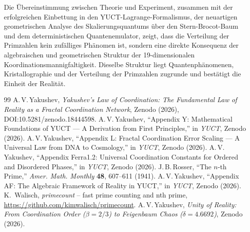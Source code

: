 \documentclass[11pt,a4paper]{article}
\begin{document}
	Die Übereinstimmung zwischen Theorie und Experiment, zusammen mit der erfolgreichen Einbettung in den YUCT-Lagrange-Formalismus, der neuartigen geometrischen Analyse des Skalierungsquantums über den Stern-Brocot-Baum und dem deterministischen Quantenemulator, zeigt, dass die Verteilung der Primzahlen kein zufälliges Phänomen ist, sondern eine direkte Konsequenz der algebraischen und geometrischen Struktur der 19-dimensionalen Koordinationsmannigfaltigkeit. Dieselbe Struktur liegt Quantenphänomenen, Kristallographie und der Verteilung der Primzahlen zugrunde und bestätigt die Einheit der Realität.
	
	\begin{thebibliography}{99}
		A.\,V.\,Yakushev, \emph{Yakushev's Law of Coordination: The Fundamental Law of Reality as a Fractal Coordination Network}, Zenodo (2026), DOI:10.5281/zenodo.18444598.
		A.\,V.\,Yakushev, ``Appendix Y: Mathematical Foundations of YUCT — A Derivation from First Principles,'' in \emph{YUCT}, Zenodo (2026).
		A.\,V.\,Yakushev, ``Appendix L: Fractal Coordination Error Scaling — A Universal Law from DNA to Cosmology,'' in \emph{YUCT}, Zenodo (2026).
		A.\,V.\,Yakushev, ``Appendix Ferra1.2: Universal Coordination Constants for Ordered and Disordered Phases,'' in \emph{YUCT}, Zenodo (2026).
		J.\,B.\,Rosser, ``The \(n\)-th Prime,'' \emph{Amer. Math. Monthly} \textbf{48}, 607--611 (1941).
		A.\,V.\,Yakushev, ``Appendix AF: The Algebraic Framework of Reality in YUCT,'' in \emph{YUCT}, Zenodo (2026).
		K.~Walisch, \emph{primecount} -- fast prime counting and nth prime, \url{https://github.com/kimwalisch/primecount}.
		A.\,V.\,Yakushev, \emph{Unity of Reality: From Coordination Order (\(\beta=2/3\)) to Feigenbaum Chaos (\(\delta=4.6692\))}, Zenodo (2026).
	\end{thebibliography}
	
\end{document}
